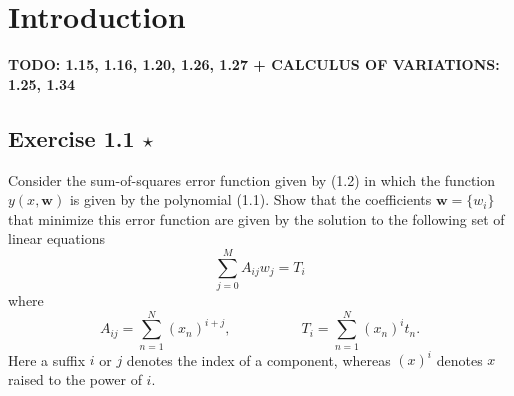 \chapter{Introduction}

\textbf{TODO: 1.15, 1.16, 1.20, 1.26, 1.27 + CALCULUS OF VARIATIONS: 1.25, 1.34}

\section*{Exercise 1.1 $\star$}
Consider the sum-of-squares error function given by (1.2) in 
which the function $y(x, \mathbf{w})$ is given by the polynomial
(1.1). Show that the coefficients $\mathbf{w} = \{ w_i \}$ that minimize
this error function are given by the solution to the following
set of linear equations
\begin{equation}\label{eq:1.122}\tag{1.122}
    \sum_{j=0}^{M} A_{ij}w_j = T_i
\end{equation}
where 
\begin{equation}\label{eq:1.123}\tag{1.123}
    A_{ij} = \sum_{n=1}^{N} (x_n)^{i + j}, \hspace{5em} T_i = \sum_{n=1}^{N} (x_n)^it_n.
\end{equation}
Here a suffix $i$ or $j$ denotes the index of a component, whereas
$(x)^i$ denotes $x$ raised to the power of $i$.

\vspace{1em}

